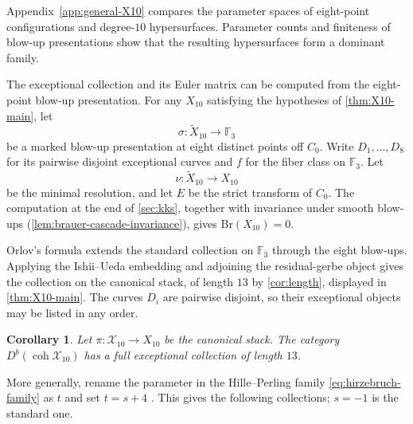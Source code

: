 \documentclass[11pt]{article}
\theoremstyle{plain}
\newtheorem{corollary}[corollary]{Corollary}
\theoremstyle{definition}
\theoremstyle{remark}
\newcommand{\F}{\mathbb F}
\newcommand{\Db}{D^b}
\newcommand{\coh}{\operatorname{coh}}
\newcommand{\Br}{\mathrm{Br}}
\begin{document}
Appendix~\ref{app:general-X10} compares the parameter spaces of eight-point
configurations and degree-$10$ hypersurfaces. Parameter counts and
finiteness of blow-up presentations show that the resulting hypersurfaces
form a dominant family.

The exceptional collection and its Euler matrix can be computed from
the eight-point blow-up presentation. For any \(X_{10}\) satisfying the
hypotheses of \cref{thm:X10-main}, let
\[
\sigma:\widetilde X_{10}\longrightarrow \F_3
\]
be a marked blow-up presentation at eight distinct points off \(C_0\). Write
\(D_1,\dots,D_8\) for its pairwise disjoint exceptional curves and
\(f\) for the fiber class on \(\F_3\). Let
\[
\nu:\widetilde X_{10}\longrightarrow X_{10}
\]
be the minimal resolution, and let \(E\) be the strict transform of \(C_0\).
The computation at the end of \cref{sec:kks}, together with invariance
under smooth blow-ups (\cref{lem:brauer-cascade-invariance}), gives
\(\Br(X_{10})=0\).

Orlov's formula extends the standard collection on \(\F_3\) through the
eight blow-ups. Applying the Ishii--Ueda embedding and adjoining the
residual-gerbe object gives the collection on the canonical stack, of
length \(13\) by \cref{cor:length}, displayed in
\cref{thm:X10-main}. The curves \(D_i\) are pairwise disjoint, so
their exceptional objects may be listed in any order.

\begin{corollary}\label{cor:X10-stack-fec} 
Let \(\pi:\mathcal X_{10}\to X_{10}\) be the canonical stack. The category \(\Db(\coh\mathcal X_{10})\) has a full exceptional collection of length \(13\).
\end{corollary}

More generally, rename the parameter in the Hille--Perling family
\eqref{eq:hirzebruch-family} as \(t\) and set \(t=s+4\)
\cite[Proposition~5.2]{HillePerling2011}. This gives the following
collections; \(s=-1\) is the standard one.
\end{document}

